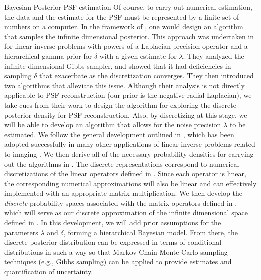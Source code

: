 \begin{chapter}{Bayesian Posterior PSF estimation}
Of course, to carry out numerical estimation, the data and the estimate for the PSF must be represented by a finite set of numbers on a computer.
In the framework of \citep{stuart2010}, one would design an algorithm that samples the infinite dimensional posterior. 
This approach was undertaken in \citep{agapiou2014analysis} for linear inverse problems with powers of a Laplacian precision operator and a hierarchical gamma prior for $\delta$ with a given estimate for $\lambda$. 
They analyzed the infinite dimensional Gibbs sampler, and showed that it had deficiencies in sampling $\delta$ that exacerbate as the discretization converges.
They then introduced two algorithms that alleviate this issue.
Although their analysis is not directly applicable to PSF reconstruction (our prior is the negative radial Laplacian), we take cues from their work to design the algorithm for exploring the discrete posterior density for PSF reconstruction.
Also, by discretizing at this stage, we will be able to develop an algorithm that allows for the noise precision $\lambda$ to be estimated.
We follow the general development outlined in \citep{bardsley2012mcmc}, which has been adopted successfully in many other applications of linear inverse problems related to imaging \citep{howard2016bayesian,bardsley2016metropolis,fowler2016stochastic,bardsley2015dealing,bardsley2013efficient}.
We then derive all of the necessary probability densities for carrying out the algorithms in .
The discrete representations correspond to numerical discretizations of the linear operators defined in .
Since each operator is linear, the corresponding numerical approximations will also be linear and can effectively implemented with an appropriate matrix multiplication.
We then develop the \emph{discrete} probability spaces associated with the matrix-operators defined in , which will serve as our discrete approximation of the infinite dimensional space defined in .
In this development, we will add prior assumptions for the parameters $\lambda$ and $\delta$, forming a hierarchical Bayesian model.
From there, the discrete posterior distribution can be expressed in terms of conditional distributions in such a way so that Markov Chain Monte Carlo sampling techniques (e.g., Gibbs sampling) can be applied to provide estimates and quantification of uncertainty.


\end{chapter}
